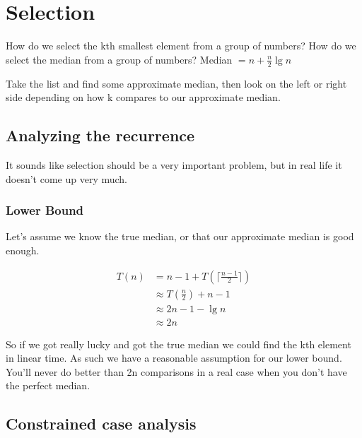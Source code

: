 \documentclass[english, 10pt]{article}
\begin{document}
\section{Selection}

How do we select the kth smallest element from a group of numbers?
How do we select the median from a group of numbers?
Median $= n+\frac{n}{2}\lg n$

\begin{algorithm}
\end{algorithm}

Take the list and find some approximate median, then look on the left or right
side depending on how k compares to our approximate median.

\subsection{Analyzing the recurrence}

It sounds like selection should be a very important problem, but in real life it doesn't come up very much.

\subsubsection{Lower Bound}
Let's assume we know the true median, or that our approximate median is good enough.

\begin{align*}
    T(n) &= n - 1 + T\left( \lceil \frac{n-1}{2} \rceil \right) \\
    &\approx T(\frac{n}{2}) + n -1 \\
    &\approx 2n -1 - \lg n \\
    &\approx 2n
\end{align*}

So if we got really lucky and got the true median we could find the kth element
in linear time. As such we have a reasonable assumption for our lower bound.
You'll never do better than 2n comparisons in a real case when you don't have
the perfect median.

\subsection{Constrained case analysis}
\end{document}
